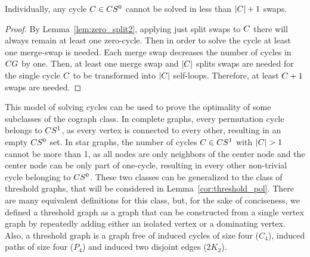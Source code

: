 \documentclass[msc,english,table,xcdraw]{ppgccufmg}
\begin{document}
\begin{lemma}
\label{lem:m_zerocycle}
Individually, any cycle $C \in CS^{0}$ cannot be solved in less
than $|C| + 1$ swaps.
\end{lemma}

\begin{proof}
    By Lemma~\ref{lem:zero_split2}, applying just split swaps to $C$ there 
    will always remain at least one zero-cycle. 
    Then in order to solve the cycle at least one merge-swap is needed. 
    Each merge swap decreases the number of cycles in $CG$ by one. 
    Then, at least one merge swap and $|C|$ splits swaps are needed 
    for the single cycle $C$ to be transformed into $|C|$ self-loops. 
    Therefore, at least $C + 1$ swaps are needed.
\end{proof}


This model of solving cycles can be used to prove the optimality of some
subclasses of the cograph class.
In complete graphs, every permutation cycle belongs to $CS^{1}$, as
every vertex is connected to every other, resulting in an empty
$CS^{0}$ set.
In star graphs, the number of cycles $C \in CS^{1}$ with 
$|C| > 1$ cannot be more than 1, as all nodes are only 
neighbors of the center node and the center node can be only part 
of one-cycle, resulting in every other non-trivial cycle belonging to 
$CS^{0}$.
These two classes can be generalized to the class of threshold graphs, 
that will be considered in Lemma~\ref{cor:threshold_pol}.
There are many equivalent definitions for this class, but, for the sake
of conciseness, we defined a threshold graph as a graph that can be constructed from
a single vertex graph by repeatedly adding either an isolated vertex or a
dominating vertex.
Also, a threshold graph is a graph free of induced cycles of size four 
($C_{4}$), induced paths of size four ($P_{4}$) and induced two disjoint 
edges ($2K_{2}$).
\end{document}
